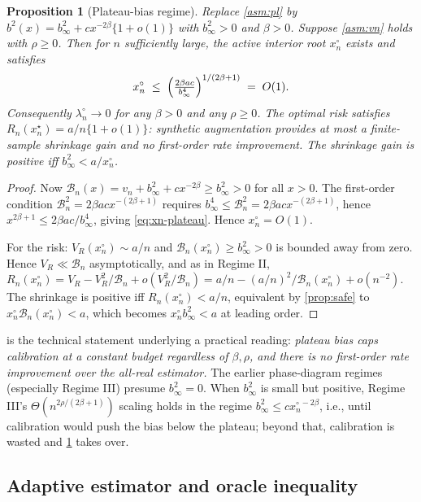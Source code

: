 \documentclass[11pt]{article}
\theoremstyle{plain}
\newtheorem{proposition}[theorem]{Proposition}
\theoremstyle{definition}
\theoremstyle{remark}
\begin{document}
\begin{proposition}[Plateau-bias regime]\label{prop:plateau}
Replace \cref{asm:pl} by $b^2(x)=b_\infty^2+cx^{-2\beta}\{1+o(1)\}$ with $b_\infty^2>0$ and $\beta>0$. Suppose \cref{asm:vn} holds with $\rho\ge0$. Then for $n$ sufficiently large, the active interior root $x_n^\circ$ exists and satisfies
\begin{equation}\label{eq:xn-plateau}
x_n^\circ\;\le\;\Bigl(\tfrac{2\beta ac}{b_\infty^4}\Bigr)^{1/(2\beta+1)}\;=\;O(1).
\end{equation}
Consequently $\lambda_n^\circ\to0$ for any $\beta>0$ and any $\rho\ge0$. The optimal risk satisfies $R_n(x_n^\star)=a/n\{1+o(1)\}$: synthetic augmentation provides at most a finite-sample shrinkage gain and no first-order rate improvement. The shrinkage gain is positive iff $b_\infty^2<a/x_n^\circ$.
\end{proposition}

\begin{proof}
Now $\mathcal{B}_n(x)=v_n+b_\infty^2+cx^{-2\beta}\ge b_\infty^2>0$ for all $x>0$. The first-order condition $\mathcal{B}_n^2=2\beta acx^{-(2\beta+1)}$ requires $b_\infty^4\le \mathcal{B}_n^2=2\beta ac x^{-(2\beta+1)}$, hence $x^{2\beta+1}\le 2\beta ac/b_\infty^4$, giving \cref{eq:xn-plateau}. Hence $x_n^\circ=O(1)$.

For the risk: $V_R(x_n^\circ)\sim a/n$ and $\mathcal{B}_n(x_n^\circ)\ge b_\infty^2>0$ is bounded away from zero. Hence $V_R\ll\mathcal{B}_n$ asymptotically, and as in Regime II, $R_n(x_n^\circ)=V_R-V_R^2/\mathcal{B}_n+o(V_R^2/\mathcal{B}_n)=a/n-(a/n)^2/\mathcal{B}_n(x_n^\circ)+o(n^{-2})$. The shrinkage is positive iff $R_n(x_n^\circ)<a/n$, equivalent by \cref{prop:safe} to $x_n^\circ\mathcal{B}_n(x_n^\circ)<a$, which becomes $x_n^\circ b_\infty^2<a$ at leading order.
\end{proof}

 is the technical statement underlying a practical reading: \emph{plateau bias caps calibration at a constant budget regardless of $\beta,\rho$, and there is no first-order rate improvement over the all-real estimator.} The earlier phase-diagram regimes (especially Regime III) presume $b_\infty^2=0$. When $b_\infty^2$ is small but positive, Regime III's $\Theta(n^{2\rho/(2\beta+1)})$ scaling holds in the regime $b_\infty^2\le c x_n^{\circ\,-2\beta}$, i.e., until calibration would push the bias below the plateau; beyond that, calibration is wasted and \cref{prop:plateau} takes over.

\subsection{Adaptive estimator and oracle inequality}
\label{ssec:adaptive}
\end{document}
